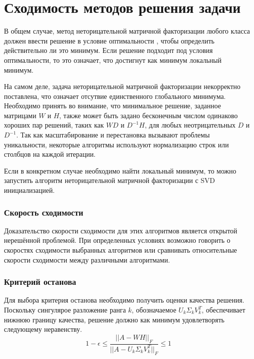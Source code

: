 \newpage





\section{Сходимость методов решения задачи}

В общем случае, метод неторицательной матричной факторизации любого класса
должен ввести решение в условие оптимальности \cite{chu},
чтобы определить действительно ли это минимум.
Если решение подходит под условия оптимальности, то это означает, что достигнут как минимум локальный минимум.

На самом деле, задача неторицательной матричной факторизации некорректно поставлена,
что означает отсутвие единственного глобального минимума.
Необходимо принять во внимание, что минимальное решение, заданное матрицами $W$ и $H$,
также может быть задано бесконечным числом одинаково хороших пар решений,
таких как $WD$ и $D^{-1}H$, для любых неотрицательных $D$ и $D^{−1}$.
Так как масштабирование и перестановка вызывают проблемы уникальности,
некоторые алгоритмы используют нормализацию строк или столбцов на каждой итерации.

Если в конкретном случае необходимо найти  локальный минимум,
то можно запустить алгоритм неторицательной матричной факторизации с SVD инициализацией.

\subsubsection{Скорость сходимости}

Доказательство скорости сходимости для этих алгоритмов является открытой нерешённой проблемой.
При определенных условиях возможно говорить о скоростях сходимости выбранных алгоритмов
или сравнивать относительные скорости сходимости между различными алгоритмами.

\subsubsection{Критерий останова}

Для выбора критерия останова необходимо получить оценки качества решения.
Поскольку сингулярое разложение ранга $k$, обозначаемое $U_k \Sigma_k V_k^T$,
обеспечивает нижнюю границу качества, решение должно как минимум удовлетворять следующему неравенству.
\begin{equation*}
  1 - \epsilon \leq \frac{||A - WH||_F}{||A - U_k \Sigma_k V_k^T||_F} \leq 1
\end{equation*}

